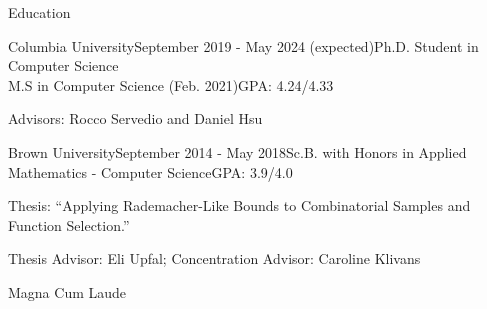 \documentclass{resume} %
\begin{document}

\begin{rSection}{Education}

\begin{rSubsection}{Columbia University}{September 2019 - May 2024 (expected)}{Ph.D. Student in Computer Science \\ M.S in Computer Science (Feb. 2021)}{GPA: 4.24/4.33}
\item Advisors: Rocco Servedio and Daniel Hsu
\end{rSubsection}

\begin{rSubsection}{Brown University}{September 2014 - May 2018}{Sc.B. with Honors in Applied Mathematics - Computer Science}{GPA: 3.9/4.0}
\item Thesis: ``Applying Rademacher-Like Bounds to Combinatorial Samples and Function Selection.''
\item Thesis Advisor: Eli Upfal; Concentration Advisor: Caroline Klivans
\item Magna Cum Laude
\end{rSubsection}

\end{rSection}




\end{document}
